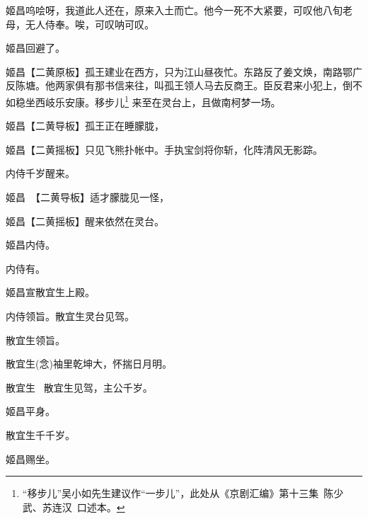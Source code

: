 {\setlength{\hangindent}{52pt}   %
{姬昌\hspace{30pt}呜哙呀，我道此人还在，原来入土而亡。他今一死不大紧要，可叹他八旬老母，无人侍奉。唉，可叹呐可叹。}

姬昌\hspace{30pt}回避了。

\setlength{\hangindent}{52pt}   %
{姬昌\hspace{30pt}【{\akai 二黄原板}】孤王建业在西方，只为江山昼夜忙。东路反了姜文焕，南路鄂广反陈塘。他两家俱有那书信来往，叫孤王领人马去反商王。臣反君来小犯上，倒不如稳坐西岐乐安康。移步儿\footnote{``移步儿''吴小如先生建议作``一步儿''，此处从《京剧汇编》第十三集~陈少武、苏连汉~口述本。}%
来至在灵台上，且做南柯梦一场。}

姬昌\hspace{30pt}【{\akai 二黄导板}】孤王正在睡朦胧，

	姬昌\hspace{30pt}【{\akai 二黄摇板}】只见飞熊扑帐中。手执宝剑将你斩，化阵清风无影踪。

内侍\hspace{30pt}千岁醒来。

姬昌\hspace{30pt}~【{\akai 二黄导板}】适才朦胧见一怪，

	姬昌\hspace{30pt}【{\akai 二黄摇板}】醒来依然在灵台。

姬昌\hspace{30pt}内侍。

内侍\hspace{30pt}有。

姬昌\hspace{30pt}宣散宜生上殿。

内侍\hspace{30pt}领旨。散宜生灵台见驾。

散宜生\hspace{20pt}领旨。

散宜生\hspace{20pt}({\akai 念})袖里乾坤大，怀揣日月明。

散宜生 \hspace{20pt}~散宜生见驾，主公千岁。

姬昌\hspace{30pt}平身。

散宜生\hspace{20pt}千千岁。

姬昌\hspace{30pt}赐坐。

}
